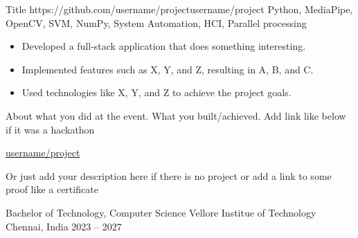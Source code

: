 \documentclass[10pt, a4paper]{styles}
\begin{document}
    \project
        {Title}
        {https://github.com/username/project}{username/project}
        {Python, MediaPipe, OpenCV, SVM, NumPy, System Automation, HCI, Parallel processing}
        \begin{itemize}
            \item Developed a full-stack application that does something interesting.
            \item Implemented features such as X, Y, and Z, resulting in A, B, and C.
            \item Used technologies like X, Y, and Z to achieve the project goals.
        \end{itemize}
    

\smallskip
\vspace{-20pt}

    {About what you did at the event. What you built/achieved. Add link like below if it was a hackathon\par
    \href{https://github.com/username/project}{\githubsymbol \hspace{0.5em}username/project}}
    \par
    
      
    \dividergray
    
    {Or just add your description here if there is no project or add a link to some proof like a certificate}\par


    \education
        {Bachelor of Technology, Computer Science}
        {Vellore Institue of Technology}
        {Chennai, India}
        {2023 -- 2027}
\end{document}
